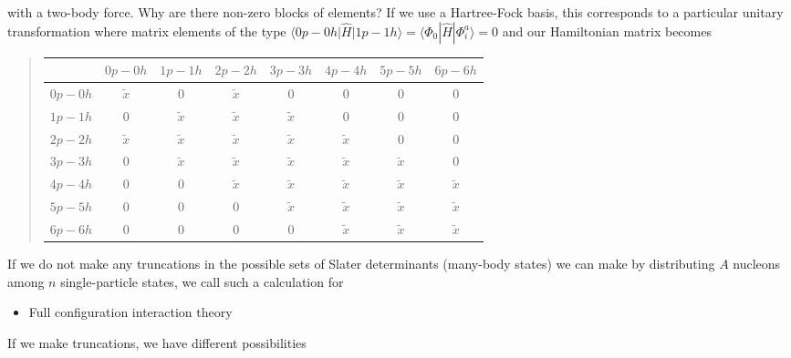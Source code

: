 \noindent
with a two-body force. Why are there non-zero blocks of elements? 
If we use a Hartree-Fock basis, this corresponds to a particular unitary transformation where matrix elements of the type $\langle 0p-0h \vert \hat{H} \vert 1p-1h\rangle =\langle \Phi_0 | \hat{H}|\Phi_{i}^{a}\rangle=0$ and our Hamiltonian matrix becomes 


\begin{quote}
\begin{tabular}{cccccccc}
\hline
\multicolumn{1}{c}{  } & \multicolumn{1}{c}{ $0p-0h$ } & \multicolumn{1}{c}{ $1p-1h$ } & \multicolumn{1}{c}{ $2p-2h$ } & \multicolumn{1}{c}{ $3p-3h$ } & \multicolumn{1}{c}{ $4p-4h$ } & \multicolumn{1}{c}{ $5p-5h$ } & \multicolumn{1}{c}{ $6p-6h$ } \\
\hline
$0p-0h$ & $\tilde{x}$ & 0           & $\tilde{x}$ & 0           & 0           & 0           & 0           \\
$1p-1h$ & 0           & $\tilde{x}$ & $\tilde{x}$ & $\tilde{x}$ & 0           & 0           & 0           \\
$2p-2h$ & $\tilde{x}$ & $\tilde{x}$ & $\tilde{x}$ & $\tilde{x}$ & $\tilde{x}$ & 0           & 0           \\
$3p-3h$ & 0           & $\tilde{x}$ & $\tilde{x}$ & $\tilde{x}$ & $\tilde{x}$ & $\tilde{x}$ & 0           \\
$4p-4h$ & 0           & 0           & $\tilde{x}$ & $\tilde{x}$ & $\tilde{x}$ & $\tilde{x}$ & $\tilde{x}$ \\
$5p-5h$ & 0           & 0           & 0           & $\tilde{x}$ & $\tilde{x}$ & $\tilde{x}$ & $\tilde{x}$ \\
$6p-6h$ & 0           & 0           & 0           & 0           & $\tilde{x}$ & $\tilde{x}$ & $\tilde{x}$ \\
\hline
\end{tabular}
\end{quote}

\noindent
If we do not make any truncations in the possible sets of Slater determinants (many-body states) we can make by distributing $A$ nucleons among $n$ single-particle states, we call such a calculation for 
\begin{itemize}
\item Full configuration interaction theory
\end{itemize}

\noindent
If we make truncations, we have different possibilities

